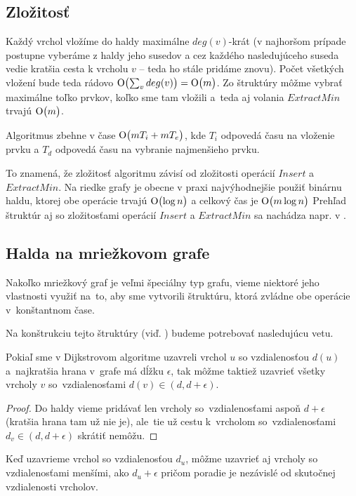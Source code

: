 \subsection{Zložitosť}
Každý vrchol vložíme do haldy maximálne $deg(v)$-krát 
(v najhoršom prípade postupne vyberáme z haldy jeho susedov a cez každého nasledujúceho suseda vedie kratšia cesta k vrcholu $v$ -- teda ho stále pridáme znovu).
Počet všetkých vložení bude teda rádovo $\operatorname{O}\bigl(\sum_{v}{deg(v)}\bigr) = \operatorname{O}\bigl(m\bigr)$.
Zo štruktúry môžme vybrať maximálne toľko prvkov, koľko sme tam vložili a~teda aj volania $ExtractMin$ trvajú $\operatorname{O}\bigl(m\bigr)$.

Algoritmus zbehne v čase $\operatorname{O}\bigl(m T_i + m T_e\bigr)$, kde $T_i$ odpovedá času na vloženie prvku a $T_d$ odpovedá času na vybranie najmenšieho prvku.

To znamená, že zložitosť algoritmu závisí od zložitosti operácií $Insert$ a $ExtractMin$. Na riedke grafy je obecne v praxi najvýhodnejšie použiť 
binárnu haldu, ktorej obe operácie trvajú $\operatorname{O}\bigl(\log{n} \bigr) $ a celkový čas je 
 $\operatorname{O}\bigl(m\log{n}\bigr)$
Prehľad štruktúr aj so zložitosťami operácií $Insert$ a $ExtractMin$ sa nachádza napr. v \cite{mares07}.

\subsection{Halda na mriežkovom grafe}
Nakoľko mriežkový graf je veľmi špeciálny typ grafu,
vieme niektoré jeho vlastnosti využiť na~to, aby sme vytvorili štruktúru, ktorá zvládne obe operácie v~konštantnom čase. 


Na konštrukciu tejto štruktúry (viď. \cite{gs97}) budeme potrebovať nasledujúcu vetu.

\begin{theorem}
\label{dinic-observation}
Pokiaľ sme v Dijkstrovom algoritme uzavreli vrchol $u$ so vzdialenosťou $d(u)$ a~najkratšia hrana v~grafe má dĺžku $\epsilon$, tak môžme taktiež 
uzavrieť všetky vrcholy $v$ so~vzdialenosťami $d(v) \in (d, d + \epsilon)$.
\end{theorem}
\begin{proof}
Do haldy vieme pridávať len vrcholy so~vzdialenosťami aspoň $d + \epsilon$ (kratšia hrana tam už nie je), 
ale~tie už cestu k~vrcholom so~vzdialenosťami
$d_v \in (d, d + \epsilon)$ skrátiť nemôžu.
\end{proof}


\begin{consequence}
Keď uzavrieme vrchol so vzdialenosťou $d_u$, môžme uzavrieť aj vrcholy so vzdialenosťami menšími, ako $d_u + \epsilon$
pričom poradie je nezávislé od skutočnej vzdialenosti vrcholov.
\end{consequence}

